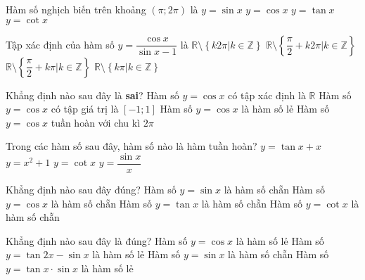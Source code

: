 \begin{ex}%
	Hàm số nghịch biến trên khoảng $(\pi ; 2 \pi)$ là
	\choice
	{$y=\sin x$}
	{$y=\cos x$}
	{$y=\tan x$}
	{\True $y=\cot x$}
\end{ex}
\begin{ex}%
	Tập xác định của hàm số $y=\dfrac{\cos x}{\sin x-1}$ là
	\choice
	{$\mathbb{R}\setminus \left\{k2\pi| k\in\mathbb{Z}\right\}$}
	{\True $\mathbb{R}\setminus \left\{\dfrac{\pi}{2}+k2\pi| k\in\mathbb{Z}\right\}$}
	{$\mathbb{R}\setminus \left\{\dfrac{\pi}{2}+k\pi| k\in\mathbb{Z}\right\}$}
	{$\mathbb{R}\setminus \left\{k\pi| k\in\mathbb{Z}\right\}$}
\end{ex}
\begin{ex}%
	Khẳng định nào sau đây là \textbf{sai}?
	\choice
	{Hàm số $y=\cos x$ có tập xác định là $\mathbb{R}$}
	{Hàm số $y=\cos x$ có tập giá trị là $[-1;1]$}
	{\True Hàm số $y=\cos x$ là hàm số lẻ}
	{Hàm số $y=\cos x$ tuần hoàn với chu kì $2\pi$}
\end{ex}
\begin{ex}%
	Trong các hàm số sau đây, hàm số nào là hàm tuần hoàn?
	\choice
	{$y=\tan x+x$}
	{$y=x^2+1$}
	{\True $y=\cot x$}
	{$y=\dfrac{\sin x}{x}$}
\end{ex}
\begin{ex}%
	Khẳng định nào sau đây đúng?
	\choice
	{Hàm số $y=\sin x$ là hàm số chẵn}
	{\True Hàm số $y=\cos x$ là hàm số chẵn}
	{Hàm số $y=\tan x$ là hàm số chẵn}
	{Hàm số $y=\cot x$ là hàm số chẵn}
\end{ex}
\begin{ex}%
	Khẳng định nào sau đây là đúng?
	\choice
	{Hàm số $y=\cos x$ là hàm số lẻ}
	{\True Hàm số $y=\tan 2x- \sin x$ là hàm số lẻ}
	{Hàm số $y=\sin x$ là hàm số chẵn}
	{Hàm số $y=\tan x \cdot \sin x$ là hàm số lẻ}
\end{ex}
